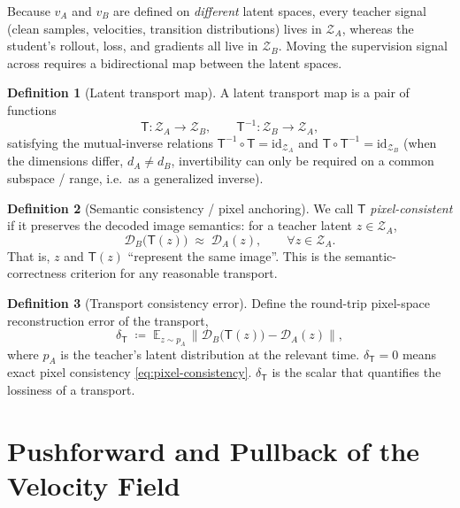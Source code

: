 \documentclass[11pt,a4paper]{article}
\newcommand{\E}{\mathbb{E}}
\newcommand{\Za}{\mathcal{Z}_{A}}
\newcommand{\Zb}{\mathcal{Z}_{B}}
\newcommand{\Dec}{\mathcal{D}}
\newcommand{\Tmap}{\mathsf{T}}
\newcommand{\Tinv}{\mathsf{T}^{-1}}
\newcommand{\norm}[1]{\left\lVert #1 \right\rVert}
\theoremstyle{definition}
\newtheorem{definition}{Definition}
\begin{document}
Because $v_A$ and $v_B$ are defined on \emph{different} latent spaces, every teacher signal
(clean samples, velocities, transition distributions) lives in $\Za$, whereas the student's
rollout, loss, and gradients all live in $\Zb$. Moving the supervision signal across requires a
bidirectional map between the latent spaces.

\begin{definition}[Latent transport map]
\label{def:transport}
A latent transport map is a pair of functions
\[
\Tmap:\Za\to\Zb,\qquad \Tinv:\Zb\to\Za,
\]
satisfying the mutual-inverse relations $\Tinv\circ\Tmap=\mathrm{id}_{\Za}$ and
$\Tmap\circ\Tinv=\mathrm{id}_{\Zb}$ (when the dimensions differ, $d_A\neq d_B$, invertibility
can only be required on a common subspace / range, i.e.\ as a generalized inverse).
\end{definition}

\begin{definition}[Semantic consistency / pixel anchoring]
\label{def:consistency}
We call $\Tmap$ \emph{pixel-consistent} if it preserves the decoded image semantics: for a
teacher latent $z\in\Za$,
\begin{equation}
\Dec_B\big(\Tmap(z)\big)\;\approx\;\Dec_A(z),
\qquad \forall z\in\Za.
\label{eq:pixel-consistency}
\end{equation}
That is, $z$ and $\Tmap(z)$ ``represent the same image''. This is the semantic-correctness
criterion for any reasonable transport.
\end{definition}

\begin{definition}[Transport consistency error]
\label{def:delta}
Define the round-trip pixel-space reconstruction error of the transport,
\begin{equation}
\delta_{\Tmap}
\;\coloneqq\;
\E_{z\sim p_A}\,\norm{\Dec_B\big(\Tmap(z)\big)-\Dec_A(z)},
\label{eq:delta}
\end{equation}
where $p_A$ is the teacher's latent distribution at the relevant time. $\delta_{\Tmap}=0$ means
exact pixel consistency \eqref{eq:pixel-consistency}. $\delta_{\Tmap}$ is the scalar that
quantifies the lossiness of a transport.
\end{definition}

\section{Pushforward and Pullback of the Velocity Field}
\label{sec:pushforward}
\end{document}
